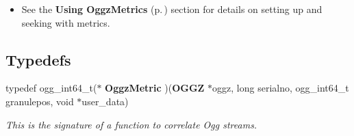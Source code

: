 \begin{itemize}
\item See the {\bf Using Oggz\-Metrics }{\rm (p.\,\pageref{group__metric})} section for details on setting up and seeking with metrics. \end{itemize}


\subsection*{Typedefs}
\begin{CompactItemize}
\item 
typedef ogg\_\-int64\_\-t($\ast$ {\bf Oggz\-Metric} )({\bf OGGZ} $\ast$oggz, long serialno, ogg\_\-int64\_\-t granulepos, void $\ast$user\_\-data)
\begin{CompactList}\small\item\em This is the signature of a function to correlate Ogg streams. \item\end{CompactList}\end{CompactItemize}
